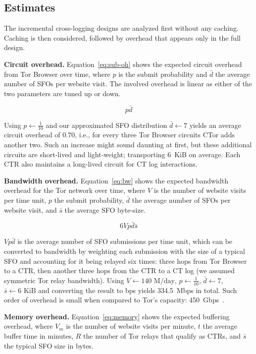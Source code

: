 \subsection{Estimates}
The incremental cross-logging designs are analyzed first without any caching.
Caching is then considered, followed by overhead that appears only in the full
design.

\textbf{Circuit overhead.}
Equation~\ref{eq:sub-oh} shows the expected circuit overhead from Tor Browser
over time, where $p$ is the submit probability and $\bar{d}$ the average number
of SFOs per website visit.  The involved overhead is linear as either of the two
parameters are tuned up or down.

\begin{equation} \label{eq:sub-oh}
	p\bar{d}
\end{equation}

Using $p\gets\frac{1}{10}$ and our approximated SFO distribution $\bar{d}\gets7$
yields an average circuit overhead of $0.70$, i.e., for every three Tor Browser
circuits CTor adds another two.  Such an increase might sound
daunting at first, but these additional circuits are short-lived and
light-weight; transporting 6~KiB on average.  Each CTR also maintains a 
long-lived circuit for CT log interactions.

\textbf{Bandwidth overhead.}  Equation~\ref{eq:bw} shows the expected
bandwidth overhead for the Tor network over time, where
	$V$ is the number of website visits per time unit,
	$p$ the submit probability,
	$\bar{d}$ the average number of SFOs per website visit, and
	$\bar{s}$ the average SFO byte-size.

\begin{equation} \label{eq:bw}
	6Vp\bar{d}\bar{s}
\end{equation}

$Vp\bar{d}$ is the average number of SFO submissions per time unit, which can be
converted to bandwidth by weighting each submission with the size of
a typical SFO and accounting for it being relayed six times:
	three hops from Tor Browser to a CTR, then
	another three hops from the CTR to a CT log
	(we assumed symmetric Tor relay bandwidth).
Using
	$V\gets 140\textrm{~M/day}$,
	$p \gets \frac{1}{10}$,
	$\bar{d} \gets 7$,
	$\bar{s} \gets 6\textrm{~KiB}$
and converting the result to bps yields 334.5~Mbps in total.  Such order of
overhead is small when compared to Tor's capacity:
450~Gbps~\cite{tor-bandwidth}.

\textbf{Memory overhead.}
Equation~\ref{eq:memory} shows the expected buffering overhead, where
	$V_m$ is the number of website visits per minute,
	$t$ the average buffer time in minutes,
	$R$ the number of Tor relays that qualify as CTRs, and
	$\bar{s}$ the typical SFO size in bytes.

